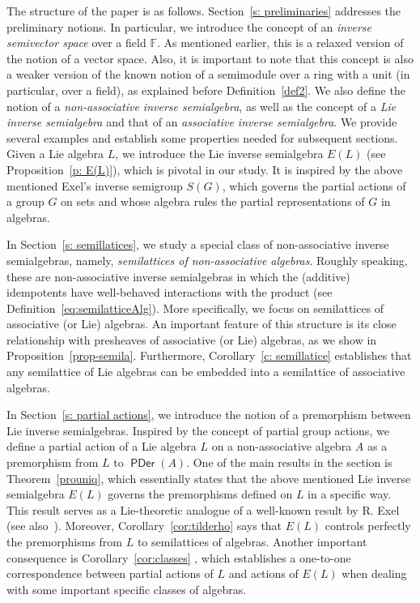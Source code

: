 \documentclass{amsart}
\newcommand{\F}{\mathbb{F}}
\newcommand{\0}{{\vartheta}}
\theoremstyle{definition}
\theoremstyle{remark}
\numberwithin{equation}{section}
\newtheorem*{Theorem A}{\textbf{Theorem A}}
\newtheorem*{Corollary E}{\textbf{Corollary E}}
\newtheorem*{Corollary F}{\textbf{Corollary F}}
\newtheorem*{Theorem B}{\textbf{Theorem B}}
\newtheorem*{Theorem C}{\textbf{Theorem C}}
\newtheorem*{Theorem D}{\textbf{Theorem B}}
\newtheorem*{p a}{\textbf{Proof of  Theorem A}}
\newtheorem*{p b}{\textbf{Proof of Theorem B}}
\newtheorem*{p c}{\textbf{Proof of  Theorem C}}
\newtheorem*{p d}{\textbf{Proof of  Theorem D}}
\DeclareMathOperator{\pde}{\textsf{PDer}}
\begin{document}
The structure of the paper is as follows. Section~\ref{s: preliminaries} addresses the preliminary notions. In particular, we introduce the concept of an \emph{inverse semivector space} over a field \( \F \). As mentioned earlier, this is a relaxed version of the notion of a vector space. Also, it is important to note that this concept is also a weaker version of the  known notion of a semimodule over a ring with a unit (in particular, over a field), as explained before Definition~\ref{def2}. We also  define the notion of a \emph{non-associative inverse semialgebra}, as well as the concept of a \emph{Lie inverse semialgebra} and that of an \emph{associative inverse semialgebra}. We provide several  examples  and establish some properties needed  for subsequent sections. Given a Lie algebra \( L \), we introduce the Lie inverse semialgebra \( E(L) \) (see Proposition~\ref{p: E(L)}), which is pivotal in our study.  It is inspired by the above mentioned Exel's inverse semigroup \( S(G) \),   which governs  the partial actions of a group  \( G \) on sets and whose algebra rules the partial representations of  \( G \) in algebras.

In Section~\ref{s: semillatices}, we study a special class of non-associative inverse semialgebras, namely, {\em semilattices of non-associative algebras}. Roughly speaking, these are non-associative inverse semialgebras in which the (additive) idempotents have well-behaved interactions with the product (see Definition~\ref{eq:semilatticeAlg}). More specifically, we focus on semilattices of  associative (or Lie) algebras. An important feature of this structure is its close relationship with presheaves of   associative (or Lie)  algebras, as  we  show in Proposition~\ref{prop-semila}. Furthermore, Corollary~\ref{c: semillatice} establishes that any semilattice of Lie algebras can be embedded into a semilattice of associative algebras.

In Section~\ref{s: partial actions}, we introduce the notion of a premorphism between Lie inverse semialgebras. Inspired by the concept of partial group actions, we define a partial action of a Lie algebra $L$ on a non-associative algebra $A$ as a premorphism from $L$ to $\pde(A)$. One of the main results in  the section is Theorem~\ref{prouniq}, which essentially states that the  above mentioned Lie inverse semialgebra $E(L)$ governs the premorphisms defined on $L$ in a specific way. This result serves as a Lie-theoretic analogue of a well-known result by R. Exel~\cite[Proposition 2.2]{Exel1998} (see also~\cite[Theorem 2.4]{KL}).  Moreover,  Corollary~\ref{cor:tilderho} says that  $E(L)$ controls perfectly the premorphisms from $L$ to  semilattices of algebras.   Another important consequence is  Corollary~\ref{cor:classes} , which  establishes a one-to-one correspondence between  partial actions of $L$ and actions of $E(L)$ when dealing with some important specific classes of algebras.
\end{document}
